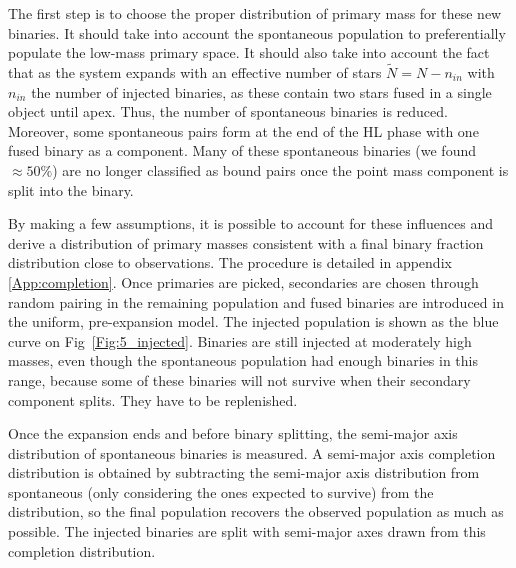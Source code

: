 The first step is to choose the proper distribution of primary mass for these new binaries. It should take into account the spontaneous population to preferentially populate the low-mass primary space. It should also take into account the fact that as the system expands with an effective number of stars $\tilde{N} = N - n_{in}$ with $n_{in}$ the number of injected binaries, as these contain two stars fused in a single object until apex. Thus, the number of spontaneous binaries is reduced. Moreover, some spontaneous pairs form at the end of the HL phase with one fused binary as a component. Many of these spontaneous binaries (we found $\approx 50\%$)  are no longer classified as bound pairs  once the point mass component is split into the binary. 

By making a few assumptions, it is possible to account for these influences and derive a distribution of primary masses consistent with a final binary fraction distribution close to observations. The procedure is detailed in appendix \ref{App:completion}. Once primaries are picked, secondaries are chosen through random pairing in the remaining population and fused binaries are introduced in the uniform, pre-expansion model. The injected population is shown as the blue curve on Fig~\ref{Fig:5_injected}. Binaries are still injected at moderately high masses, even though the spontaneous population had enough binaries in this range, because some of these binaries will not survive when their secondary component splits. They have to be replenished.



Once the expansion ends and before binary splitting, the semi-major axis distribution of spontaneous binaries is measured. A semi-major axis completion distribution is obtained by subtracting the semi-major axis distribution from spontaneous (only considering the ones expected to survive) from the \cite{Raghavan2010} distribution, so the final population recovers the observed population as much as possible. The injected binaries are split with semi-major axes drawn from this completion distribution. 




